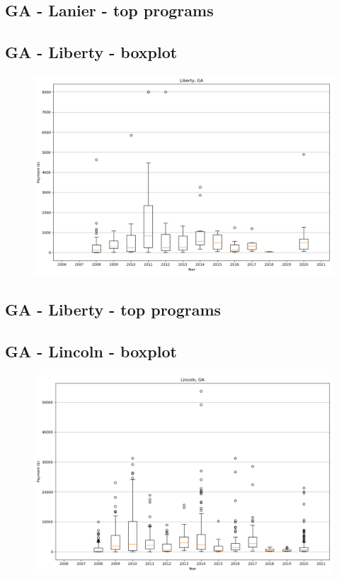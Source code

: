 \subsection*{GA - Lanier - top programs}

\newpage
\subsection*{GA - Liberty - boxplot}
\begin{figure}[h]
\centering
\includegraphics[width=7in]{../output/boxplots/counties/Liberty-GA_boxplot.png}
\end{figure}


\subsection*{GA - Liberty - top programs}

\newpage
\subsection*{GA - Lincoln - boxplot}
\begin{figure}[h]
\centering
\includegraphics[width=7in]{../output/boxplots/counties/Lincoln-GA_boxplot.png}
\end{figure}


